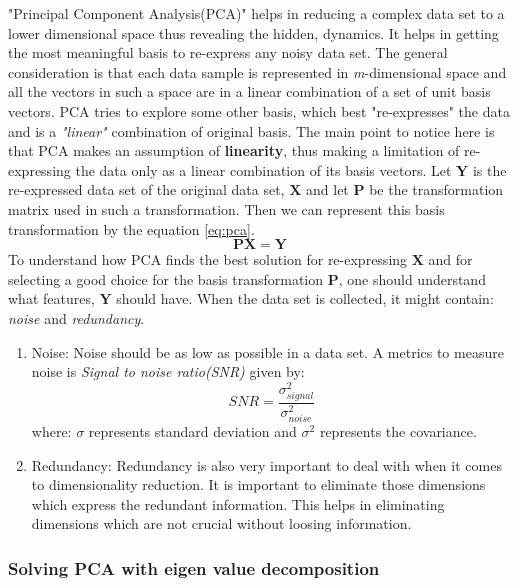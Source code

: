 "Principal Component Analysis(PCA)" helps in reducing a complex data set to a lower dimensional space thus revealing the hidden, dynamics. It helps in getting the most meaningful basis to re-express any noisy data set. The general consideration is that each data sample is represented in \textit{m}-dimensional space and all the vectors in such a space are in a linear combination of a set of unit basis vectors. PCA tries to explore some other basis, which best "re-expresses" the data and is a \textit{"linear"} combination of original basis. The main point to notice here is that PCA makes an assumption of \textbf{linearity}, thus making a limitation of re-expressing the data only as a linear combination of its basis vectors. Let $\mathbf{Y}$ is the re-expressed data set of the original data set, $\mathbf{X}$ and let $\mathbf{P}$ be the transformation matrix used in such a transformation. Then we can represent this basis transformation by the equation \ref{eq:pca}.
\begin{equation}\label{eq:pca}
\mathbf{PX = Y} 
\end{equation}
To understand how PCA finds the best solution for re-expressing $\mathbf{X}$ and for selecting a good choice for the basis transformation $\mathbf{P}$, one should understand what features, $\mathbf{Y}$ should have. When the data set is collected, it might contain: \textit{noise} and \textit{redundancy}.
\begin{enumerate}
	\item{Noise:} Noise should be as low as possible in a data set. A metrics to measure noise is \textit{Signal to noise ratio(SNR)} given by:
	\begin{equation}
	\mathit{SNR} = \dfrac{\sigma^2_{signal}}{\sigma^2_{noise}}
	\end{equation}
	where: $\sigma$ represents standard deviation and $\sigma^2$ represents the covariance.
	\item{Redundancy:} 
	Redundancy is also very important to deal with when it comes to dimensionality reduction. It is important to eliminate those dimensions which express the redundant information. This helps in eliminating dimensions which are not crucial without loosing information. 
\end{enumerate}
\subsubsection{Solving PCA with eigen value decomposition}
